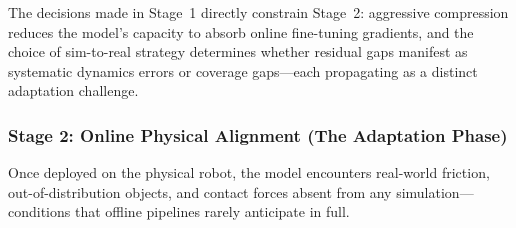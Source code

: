 \documentclass[acmsmall,screen,review,anonymous]{acmart}
\begin{document}
The decisions made in Stage~1 directly constrain Stage~2: aggressive compression reduces the model's capacity to absorb online fine-tuning gradients, and the choice of sim-to-real strategy determines whether residual gaps manifest as systematic dynamics errors or coverage gaps---each propagating as a distinct adaptation challenge.

\subsubsection{Stage 2: Online Physical Alignment (The Adaptation Phase)}

Once deployed on the physical robot, the model encounters real-world friction, out-of-distribution objects, and contact forces absent from any simulation---conditions that offline pipelines rarely anticipate in full.
\end{document}
